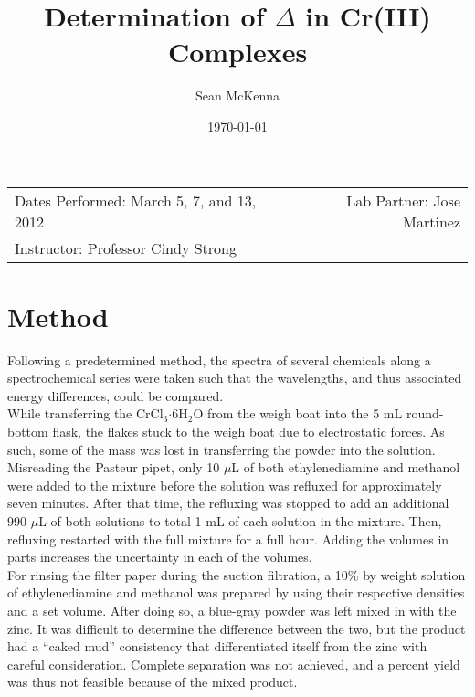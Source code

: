 \documentclass[11pt]{article}
\title{Determination of $\Delta$\sub{o} in Cr(III) Complexes}
\author{Sean McKenna}
\date{\today}
\newcommand{\sub}[1]{\ensuremath{_{\textrm{#1}}}}
\begin{document}
\maketitle

\begin{center}
\begin{tabular}{lr}
Dates Performed: March 5, 7, and 13, 2012 & Lab Partner: Jose Martinez\\
Instructor: Professor Cindy Strong
\end{tabular}
\end{center}


\section{Method}
Following a predetermined method,\cite{lab} the spectra of several chemicals along a spectrochemical series were taken such that the wavelengths, and thus associated energy differences, could be compared. \\

While transferring the CrCl\sub{3}$\cdot$6H\sub{2}O from the weigh boat into the 5 mL round-bottom flask, the flakes stuck to the weigh boat due to electrostatic forces. As such, some of the mass was lost in transferring the powder into the solution. \\

Misreading the Pasteur pipet, only 10 $\mu$L of both ethylenediamine and methanol were added to the mixture before the solution was refluxed for approximately seven minutes. After that time, the refluxing was stopped to add an additional 990 $\mu$L of both solutions to total 1 mL of each solution in the mixture. Then, refluxing restarted with the full mixture for a full hour. Adding the volumes in parts increases the uncertainty in each of the volumes. \\

For rinsing the filter paper during the suction filtration, a 10\% by weight solution of ethylenediamine and methanol was prepared by using their respective densities and a set volume. After doing so, a blue-gray powder was left mixed in with the zinc. It was difficult to determine the difference between the two, but the product had a ``caked mud'' consistency that differentiated itself from the zinc with careful consideration. Complete separation was not achieved, and a percent yield was thus not feasible because of the mixed product. \\
\end{document}
